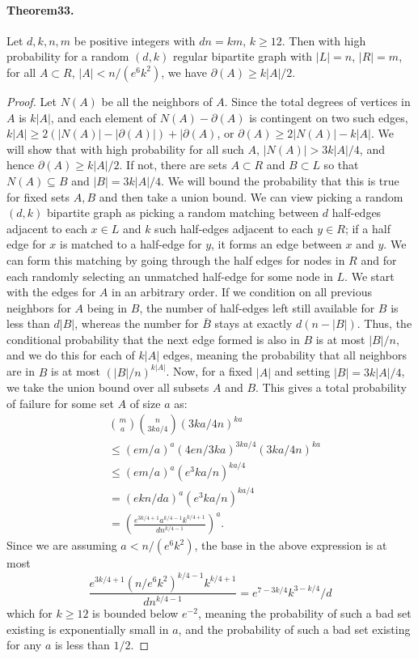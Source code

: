 \paragraph{Theorem33.} Let $d,k,n,m$ be positive integers with $dn=km$, $k\geq12$. Then with high probability for a random $(d,k)$ regular bipartite graph with $|L|=n$, $|R|=m$, for all $A\subset R$, $|A|<n/(e^6k^2)$, we have $\partial(A)\geq k|A|/2$.
\begin{proof}
Let $N(A)$ be all the neighbors of $A$. Since the total degrees of vertices in $A$ is $k|A|$, and each element of $N(A)-\partial(A)$ is contingent on two such edges, $k|A|\geq2(|N(A)|-|\partial(A)|)+|\partial(A)$, or $\partial(A)\geq2|N(A)|-k|A|$. We will show that with high probability for all such $A$, $|N(A)|>3k|A|/4$, and hence $\partial(A)\geq k|A|/2$.
If not, there are sets $A\subset R$ and $B\subset L$ so that $N(A)\subseteq B$ and $|B|=3k|A|/4$. We will bound the probability that this is true for fixed sets $A,B$ and then take a union bound. We can view picking a random $(d,k)$ bipartite graph as picking a random matching between $d$ half-edges adjacent to each $x\in L$ and $k$ such half-edges adjacent to each $y\in R$; if a half edge for $x$ is matched to a half-edge for $y$, it forms an edge between $x$ and $y$.
We can form this matching by going through the half edges for nodes in $R$ and for each randomly selecting an unmatched half-edge for some node in $L$. We start with the edges for $A$ in an arbitrary order. If we condition on all previous neighbors for $A$ being in $B$, the number of half-edges left still available for $B$ is less than $d|B|$, whereas the number for $\bar B$ stays at exactly $d(n-|B|)$. Thus, the conditional probability that the next edge formed is also in $B$ is at most $|B|/n$, and we do this for each of $k|A|$ edges, meaning the probability that all neighbors are in $B$ is at most $(|B|/n)^{k|A|}$.
Now, for a fixed $|A|$ and setting $|B|=3k|A|/4$, we take the union bound over all subsets $A$ and $B$. This gives a total probability of failure for some set $A$ of size $a$ as:
\begin{align*}
&\binom ma\binom n{3ka/4}(3ka/4n)^{ka}\\
&\leq(em/a)^a(4en/3ka)^{3ka/4}(3ka/4n)^{ka}\\
&\leq(em/a)^a(e^3ka/n)^{ka/4}\\
&=(ekn/da)^a(e^3ka/n)^{ka/4}\\
&=\left(\frac{e^{3k/4+1}a^{k/4-1}k^{k/4+1}}{dn^{k/4-1}}\right)^a.
\end{align*}
Since we are assuming $a<n/(e^6k^2)$, the base in the above expression is at most
\[\frac{e^{3k/4+1}(n/e^6k^2)^{k/4-1}k^{k/4+1}}{dn^{k/4-1}}=e^{7-3k/4}k^{3-k/4}/d\]
which for $k\geq12$ is bounded below $e^{-2}$, meaning the probability of such a bad set existing is exponentially small in $a$, and the probability of such a bad set existing for any $a$ is less than $1/2$.
\end{proof}
